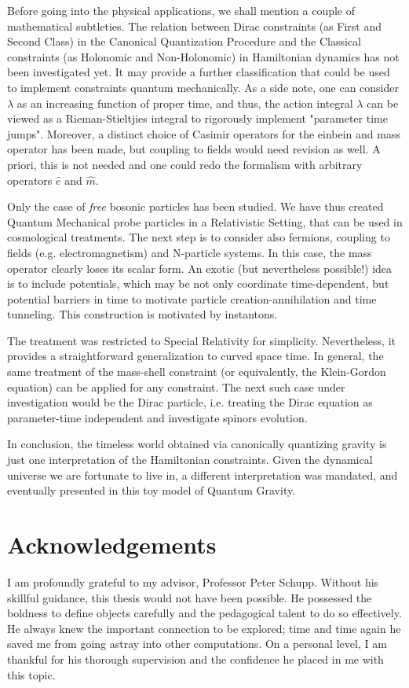 \documentclass[twoside,a4paper,11pt]{article}
\numberwithin{equation}{section}
\begin{document}
Before going into the physical applications, we shall mention a couple of mathematical subtleties. The relation between Dirac constraints (as First and Second Class) in the Canonical Quantization Procedure and the Classical constraints (as Holonomic and Non-Holonomic) in Hamiltonian dynamics has not been investigated yet. It may provide a further classification that could be used to implement constraints quantum mechanically. As a side note, one can consider $\lambda$ as an increasing function of proper time, and thus, the action integral $\lambda$ can be viewed as a Rieman-Stieltjies integral to rigorously implement "parameter time jumps". Moreover, a distinct choice of Casimir operators for the einbein and mass operator has been made, but coupling to fields would need revision as well. A priori, this is not needed and one could redo the formalism with arbitrary operators $\hat{e}$ and $\hat{m}$. 


Only the case of \textit{free} bosonic particles has been studied. We have thus created Quantum Mechanical probe particles in a Relativistic Setting, that can be used in cosmological treatments. The next step is to consider also fermions, coupling to fields (e.g. electromagnetism) and N-particle systems. In this case, the mass operator clearly loses its scalar form. An exotic (but nevertheless possible!) idea is to include potentials, which may be not only coordinate time-dependent, but potential barriers in time to motivate particle creation-annihilation and time tunneling. This construction is motivated by instantons. 
    
The treatment was restricted to Special Relativity for simplicity. Nevertheless, it provides a straightforward generalization to curved space time. In general, the same treatment of the mass-shell constraint (or equivalently, the Klein-Gordon equation) can be applied for any constraint. The next such case under investigation would be the Dirac particle, i.e. treating the Dirac equation as parameter-time independent and investigate spinors evolution.

In conclusion, the timeless world obtained via canonically quantizing gravity is just one interpretation of the Hamiltonian constraints. Given the dynamical universe we are fortunate to live in, a different interpretation was mandated, and eventually presented in this toy model of Quantum Gravity.

\newpage

\section*{Acknowledgements}
I am profoundly grateful to my advisor, Professor Peter Schupp. Without his skillful guidance, this thesis would not have been possible. He possessed the boldness to define objects carefully and the pedagogical talent to do so effectively. He always knew the important connection to be explored; time and time again he saved me from going astray into other computations. On a personal level, I am thankful for his thorough supervision and the confidence he placed in me with this topic.  
\end{document}

